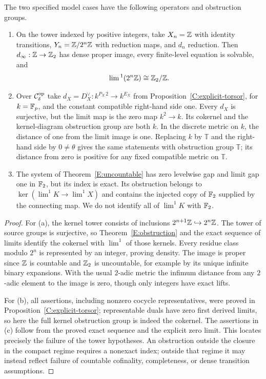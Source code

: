 \begin{proposition}\label{E:models}
The two specified model cases have the following operators and obstruction groups.
\begin{enumerate}[label=(\alph*)]
\item On the tower indexed by positive integers, take $X_n=\mathbb Z$ with identity transitions, $Y_n=\mathbb Z/2^n\mathbb Z$ with reduction maps, and $d_n$ reduction. Then $d_\infty:\mathbb Z\to\mathbb Z_2$ has dense proper image, every finite-level equation is solvable, and
\[
 \lim{}^1(2^n\mathbb Z)\cong\mathbb Z_2/\mathbb Z.
\]
\item Over $\mathcal C_\delta^{\mathrm{op}}$ take $d_X=D_X^\vee:k^{P_X\,2}\to k^{E_X}$ from Proposition~\ref{C:explicit-torsor}, for $k=\mathbb F_p$, and the constant compatible right-hand side one. Every $d_X$ is surjective, but the limit map is the zero map $k^2\to k$. Its cokernel and the kernel-diagram obstruction group are both $k$. In the discrete metric on $k$, the distance of one from the limit image is one. Replacing $k$ by $\mathbb T$ and the right-hand side by $0\ne\theta$ gives the same statements with obstruction group $\mathbb T$; its distance from zero is positive for any fixed compatible metric on $\mathbb T$.
\item The system of Theorem~\ref{E:uncountable} has zero levelwise gap and limit gap one in $\mathbb F_2$, but its index is exact. Its obstruction belongs to $\ker(\lim^1K\to\lim^1X)$ and contains the injected copy of $\mathbb F_2$ supplied by the connecting map. We do not identify all of $\lim^1K$ with $\mathbb F_2$.
\end{enumerate}
\end{proposition}
\begin{proof}
For (a), the kernel tower consists of inclusions $2^{n+1}\mathbb Z\hookrightarrow2^n\mathbb Z$. The tower of source groups is surjective, so Theorem~\ref{E:obstruction} and the exact sequence of limits identify the cokernel with $\lim^1$ of those kernels. Every residue class modulo $2^n$ is represented by an integer, proving density. The image is proper since $\mathbb Z$ is countable and $\mathbb Z_2$ is uncountable, for example by its unique infinite binary expansions. With the usual $2$-adic metric the infimum distance from any $2$-adic element to the image is zero, though only integers have exact lifts.

For (b), all assertions, including nonzero cocycle representatives, were proved in Proposition~\ref{C:explicit-torsor}; representable duals have zero first derived limits, so here the full kernel obstruction group is indeed the cokernel. The assertions in (c) follow from the proved exact sequence and the explicit zero limit. This locates precisely the failure of the tower hypotheses. An obstruction outside the closure in the compact regime requires a nonexact index; outside that regime it may instead reflect failure of countable cofinality, completeness, or dense transition assumptions.
\end{proof}


